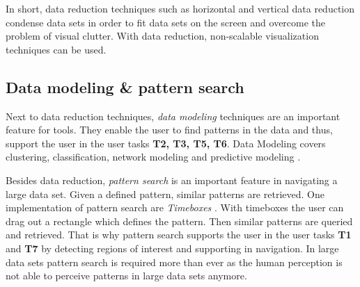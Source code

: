 In short, data reduction techniques such as horizontal and vertical data reduction condense  data sets in order to fit data sets on the screen and overcome the problem of visual clutter. With data reduction, non-scalable visualization techniques can be used. 

\subsection{Data modeling \& pattern search}\label{patternsearch}
Next to data reduction techniques, \textit{data modeling} techniques are an important feature for tools. They enable the user to find patterns in the data and thus, support the user in the user tasks \textbf{T2, T3, T5, T6}. Data Modeling covers clustering, classification, network modeling and predictive modeling \cite{Zhang2001}. 
\par
Besides data reduction, \textit{pattern search} is an important feature in navigating a large data set. Given a defined pattern, similar patterns are retrieved. One implementation of pattern search are \textit{Timeboxes}  \cite{Buono2005}. With timeboxes the user can drag out a rectangle which defines the pattern. Then similar patterns are queried and retrieved. That is why pattern search supports the user in the user tasks \textbf{T1} and \textbf{T7} by detecting regions of interest and supporting in navigation. In large data sets pattern search is required more than ever as the human perception is not able to perceive patterns in large data sets anymore.


